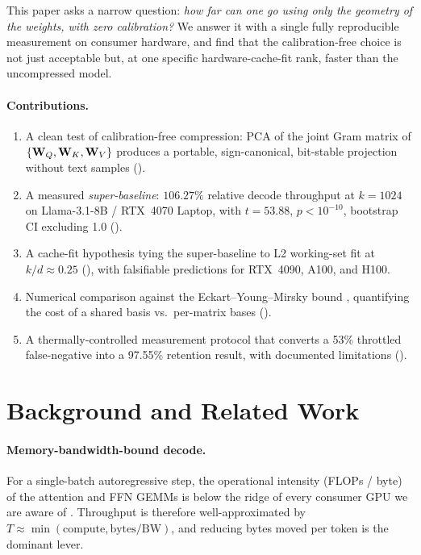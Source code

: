 \documentclass[11pt]{article}
\begin{document}
This paper asks a narrow question: \emph{how far can one go using only the
geometry of the weights, with zero calibration?}  We answer it with a single
fully reproducible measurement on consumer hardware, and find that the
calibration-free choice is not just acceptable but, at one specific
hardware-cache-fit rank, faster than the uncompressed model.

\paragraph{Contributions.}
\begin{enumerate}
\item A clean test of calibration-free compression: PCA of the joint Gram
matrix of $\{\mathbf{W}_Q,\mathbf{W}_K,\mathbf{W}_V\}$ produces a portable, sign-canonical,
bit-stable projection without text samples ().
\item A measured \emph{super-baseline}: $106.27\%$ relative decode throughput
at $k{=}1024$ on Llama-3.1-8B / RTX~4070 Laptop, with $t{=}53.88$,
$p<10^{-10}$, bootstrap CI excluding 1.0 ().
\item A cache-fit hypothesis tying the super-baseline to L2 working-set fit at
$k/d\!\approx\!0.25$ (), with falsifiable predictions for
RTX~4090, A100, and H100.
\item Numerical comparison against the Eckart--Young--Mirsky bound
\cite{eckart1936}, quantifying the cost of a shared basis vs.\ per-matrix
bases ().
\item A thermally-controlled measurement protocol that converts a 53\%
throttled false-negative into a 97.55\% retention result, with
documented limitations ().
\end{enumerate}

\section{Background and Related Work}
\label{sec:background}

\paragraph{Memory-bandwidth-bound decode.}
For a single-batch autoregressive step, the operational intensity (FLOPs /
byte) of the attention and FFN GEMMs is below the ridge of every consumer GPU
we are aware of \cite{yuan2024llmroofline,nvidia2022ada}.  Throughput is
therefore well-approximated by
$T \approx \min(\text{compute}, \text{bytes}/\text{BW})$, and reducing bytes
moved per token is the dominant lever.
\end{document}
